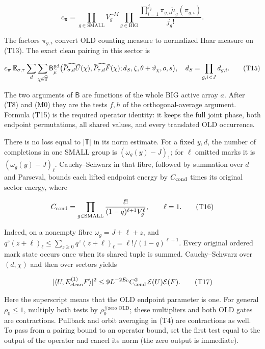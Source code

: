 \[
c_{\boldsymbol\pi}=
 \prod_{g\in\mathrm{SMALL}}V_g^{-M}
 \prod_{g\in\mathrm{BIG}}
       \frac{\prod_{i=1}^{j_g}\pi_{g,i}\widetilde\mu_g(\pi_{g,i})}{j_g!}.
\]

The factors \(\pi_{g,i}\) convert OLD counting measure to normalized
Haar measure on (T13). The exact clean pairing in this sector is

\[
c_{\boldsymbol\pi}\,
 \mathbb E_{\sigma,\tau}\sum_d\sum_{\chi\in\widehat{\mathbb T}}
 \mathsf B_{\widetilde\mu}^{\rm nd}
   \bigl(\widehat{P_{\sigma,d}U}(\chi),
         \widehat{P_{\tau,d}F}(\chi);
         d_S,\zeta,\theta+\vartheta_\chi,o,s\bigr),
\quad d_S=\prod_{g,i<J}d_{g,i}.
\tag{T15}
\]

The two arguments of \(\mathsf B\) are functions of the whole BIG active
array \(a\). After (T8) and (M0) they are the tests \(f,h\) of the
orthogonal-average argument. Formula (T15) is the required operator
identity: it keeps the full joint phase, both endpoint permutations, all
shared values, and every translated OLD occurrence.

There is no loss equal to \(|\mathbb T|\) in its norm estimate. For a
fixed \(y,d\), the number of completions in one SMALL group is
\((\omega_g(y)-J)_{1}\); for \(\ell\) omitted marks it is
\((\omega_g(y)-J)_{\ell}\). Cauchy--Schwarz in that fibre, followed by
summation over \(d\) and Parseval, bounds each lifted endpoint energy by
\(C_{\rm cond}\) times its original sector energy, where

\[
C_{\rm cond}=\prod_{g\in\mathrm{SMALL}}
       \frac{\ell!}{(1-q)^{\ell+1}V_g^\ell},\qquad \ell=1.
\tag{T16}
\]

Indeed, on a nonempty fibre \(\omega_g=J+\ell+z\), and
\(q^z(z+\ell)_{\ell}\le\sum_{z\ge0}q^z(z+\ell)_{\ell} =\ell!/(1-q)^{\ell+1}\).
Every original ordered mark state occurs once when its shared tuple is
summed. Cauchy--Schwarz over \((d,\chi)\) and then over sectors yields

\[
|\langle U,E_{\rm clean}^{(1)}F\rangle|^2
 \le9L^{-2E_0}C_{\rm cond}^2\,\mathcal E(U)\mathcal E(F).
\tag{T17}
\]

Here the superscript means that the OLD endpoint parameter is one. For
general \(\rho_0\le1\), multiply both tests by
\(\rho_0^{\#\text{zero OLD}}\); these multipliers and both OLD gates are
contractions. Pullback and orbit averaging in (T4) are contractions as
well. To pass from a pairing bound to an operator bound, set the first
test equal to the output of the operator and cancel its norm (the zero
output is immediate).

